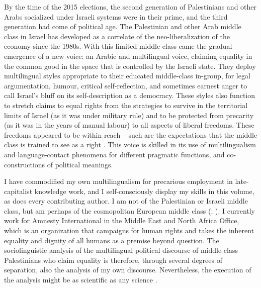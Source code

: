 \documentclass[output=paper,arabicfont]{langscibook}
\begin{document}
By the time of the 2015 elections, the second generation of Palestinians and other Arabs socialized under Israeli systems were in their prime, and the third generation had come of political age. The Palestinian and other Arab middle class in Israel has developed as a correlate of the neo-liberalization of the economy since the 1980s. With this limited middle class came the gradual emergence of a new voice: an Arabic and multilingual voice, claiming equality in the common good in the space that is controlled by the Israeli state. They deploy multilingual styles \citep{eckert2004a} appropriate to their educated middle-class in-group, for legal argumentation, humour, critical self-reflection, and sometimes earnest anger to call Israel’s bluff on its self-description as a democracy. These styles also function to stretch claims to equal rights from the strategies  to survive in the territorial limits of Israel (as it was under military rule) and to be protected from precarity (as it was in the years of manual labour) to all aspects of liberal freedoms. These freedoms appeared to be within reach – such are the expectations that the middle class is trained to see as a right \citep{dean2014a}. This voice is skilled in its use of multilingualism and language-contact phenomena for different pragmatic functions, and co-constructions of political meanings.

I have commodified my own multilingualism for precarious employment in late-capitalist knowledge work, and I self-consciously display my skills in this volume, as does every contributing author. I am not of the Palestinian or Israeli middle class, but am perhaps of the cosmopolitan European middle class (\citealt{hartung2017a}; \citealt[21–86]{nowicka2016a}). I currently work for Amnesty International in the Middle East and North Africa Office, which is an organization that campaigns for human rights and takes the inherent equality and dignity of all humans as a premise beyond question. The sociolinguistic analysis of the multilingual political discourse of middle-class Palestinians who claim equality is therefore, through several degrees of separation, also the analysis of my own discourse. Nevertheless, the execution of the analysis might be as scientific as any science \citep[76–78]{bourdieu2004a}.
\end{document}
